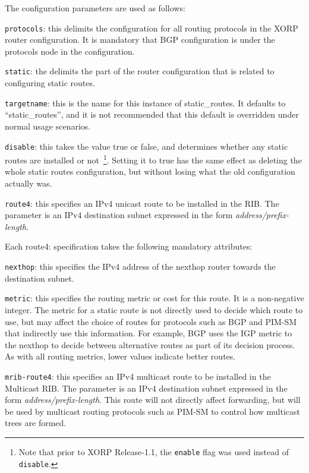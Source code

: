 The configuration parameters are used as follows:
\begin{description}
\item{\tt protocols}: this delimits the configuration for all routing
  protocols in the XORP router configuration.  It is mandatory that
  BGP configuration is under the {\stt protocols} node in the
  configuration.
\item{\tt static}: the delimits the part of the router configuration
  that is related to configuring static routes.
\item{\tt targetname}: this is the name for this instance of
  static\_routes.  It defaults to ``{\stt static\_routes}'', and it is
  not recommended that this default is overridden under normal usage
  scenarios.
\item{\tt disable}: this takes the value {\stt true} or {\stt false},
  and determines whether any static routes are installed or not~\footnote{Note
  that prior to XORP Release-1.1, the {\tt enable} flag was used instead of
  {\tt disable}.}.
  Setting it to {\stt true} has the same effect as deleting the whole
  static routes configuration, but without losing what the old
  configuration actually was.
\item{\tt route4}: this specifies an IPv4 unicast route to be
  installed in the RIB.  The parameter is an IPv4 destination subnet
  expressed in the form {\it address/prefix-length}.

  Each {\stt route4}: specification takes the following mandatory
  attributes:
\begin{description}
\item{\tt nexthop}: this specifies the IPv4 address of the nexthop
  router towards the destination subnet.
\item{\tt metric}: this specifies the routing metric or cost for this
  route.  It is a non-negative integer.  The metric for a static route
  is not directly used to decide which route to use, but may affect
  the choice of routes for protocols such as BGP and PIM-SM that
  indirectly use this information.  For example, BGP uses the IGP
  metric to the nexthop to decide between alternative routes as part
  of its decision process.  As with all routing metrics, lower values
  indicate better routes.
\end{description}
\item{\tt mrib-route4}: this specifies an IPv4 multicast route to be
  installed in the Multicast RIB.  The parameter is an IPv4
  destination subnet expressed in the form {\it
  address/prefix-length}.  This route will not directly affect
  forwarding, but will be used by multicast routing protocols such as
  PIM-SM to control how multicast trees are formed.


\end{description}
